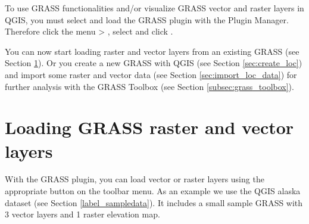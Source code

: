 To use GRASS functionalities and/or visualize GRASS vector and raster layers 
in QGIS, you must select and load the GRASS plugin with the Plugin Manager. 
Therefore click the menu  > , 
select  and click . 

You can now start loading raster and vector layers from an existing GRASS 
 (see Section \ref{sec:load_grassdata}). Or you create a 
new GRASS  with QGIS (see Section \ref{sec:create_loc}) 
and import some raster and vector data (see Section \ref{sec:import_loc_data}) 
for further analysis with the GRASS Toolbox (see Section 
\ref{subsec:grass_toolbox}).

\section{Loading GRASS raster and vector layers}\label{sec:load_grassdata}

With the GRASS plugin, you can load vector or raster layers using the
appropriate button on the toolbar menu. As an example we use the QGIS alaska
dataset (see Section \ref{label_sampledata}). It includes a small sample 
GRASS  with 3 vector layers and 1 raster elevation map.

